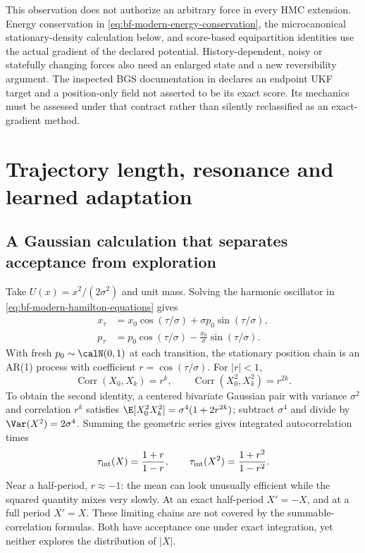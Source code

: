 This observation does not authorize an arbitrary force in every HMC
extension. Energy conservation in \eqref{eq:bf-modern-energy-conservation},
the microcanonical stationary-density calculation below, and score-based
equipartition identities use the actual gradient of the declared potential.
History-dependent, noisy or statefully changing forces also need an enlarged
state and a new reversibility argument. The inspected BGS documentation in
 declares an endpoint UKF target and a position-only field not
asserted to be its exact score. Its mechanics must be assessed under that
contract rather than silently reclassified as an exact-gradient method.

\section{Trajectory length, resonance and learned adaptation}
\label{sec:bf-modern-trajectories}

\subsection{A Gaussian calculation that separates acceptance from exploration}

Take $U(x)=x^2/(2\sigma^2)$ and unit mass. Solving the harmonic oscillator
in \eqref{eq:bf-modern-hamilton-equations} gives
\begin{align}
 x_\tau&=x_0\cos(\tau/\sigma)+\sigma p_0\sin(\tau/\sigma),\\
 p_\tau&=p_0\cos(\tau/\sigma)-\frac{x_0}{\sigma}\sin(\tau/\sigma).
 \label{eq:bf-modern-gaussian-flow}
\end{align}
With fresh $p_0\sim\calN(0,1)$ at each transition, the stationary position
chain is an AR(1) process with coefficient $r=\cos(\tau/\sigma)$. For
$|r|<1$,
\begin{equation}
 \operatorname{Corr}(X_0,X_k)=r^k,\qquad
 \operatorname{Corr}(X_0^2,X_k^2)=r^{2k}.
 \label{eq:bf-modern-gaussian-correlations}
\end{equation}
To obtain the second identity, a centered bivariate Gaussian pair with
variance $\sigma^2$ and correlation $r^k$ satisfies
$\E[X_0^2X_k^2]=\sigma^4(1+2r^{2k})$; subtract
$\sigma^4$ and divide by $\Var(X^2)=2\sigma^4$. Summing the geometric
series gives integrated autocorrelation times
\begin{equation}
 \tau_{\rm int}(X)=\frac{1+r}{1-r},\qquad
 \tau_{\rm int}(X^2)=\frac{1+r^2}{1-r^2}.
 \label{eq:bf-modern-gaussian-iat}
\end{equation}
Near a half-period, $r\approx-1$: the mean can look unusually efficient
while the squared quantity mixes very slowly. At an exact half-period
$X'=-X$, and at a full period $X'=X$. These limiting chains are not covered
by the summable-correlation formulas. Both have acceptance one under exact
integration, yet neither explores the distribution of $|X|$.

